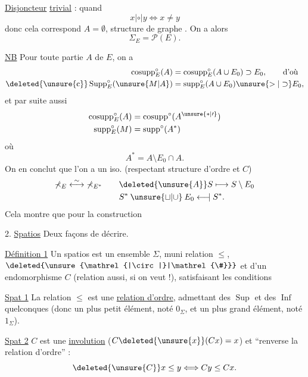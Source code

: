 \uline{Disjoncteur} \uline{trivial} : quand
\[
x\mathrel{|\circ|}y\Longleftrightarrow x\ne y
\]
donc cela correspond  $A=\emptyset$, structure de graphe . On a alors
\[
\mathbb{\Sigma}_{E}=\mathcal{P}(E).
\]

\uline{NB} Pour toute partie $A$ de $E$, on a
\[
\begin{aligned}
\operatorname{cosupp}_{E}^{\circ}(A)&=\operatorname{cosupp}_{E}^{\circ}(A\cup E_{0})\supset E_{0},\qquad\text{d'où}\\
\deleted{\unsure{\mathrm{c}}}\operatorname{Supp}_{E}^{\circ}(\unsure{M|A})&=\operatorname{supp}_{E}^{\circ}(A\cup E_{0})\unsure{>|\supset} E_{0},
\end{aligned}
\]
et par suite aussi
\[
\begin{aligned}
\operatorname{cosupp}_{E}^{\circ}(A)&=\operatorname{cosupp}^{\circ}(A^{\unsure{\ast|\prime}})\\
\operatorname{supp}_{E}^{\circ}(M)&=\operatorname{supp}^{\circ}(A^{\ast})
\end{aligned}
\]
où
\[
A^{\ast}=A\setminus E_{0}\cap A.
\]
On en conclut que l'on a un iso. (respectant structure d'ordre et $C$)
\[
\begin{aligned}
\mathbb{\Sigma}_{E}\mathrel{\overset{\sim}{\longleftrightarrow}}\mathbb{\Sigma}_{E^{\ast}}\qquad &\deleted{\unsure{A}}S\longmapsto S\setminus E_{0}\\
&S^{\ast}\mathbin{\unsure{\sqcup|\cup}}E_{0}\mathrel{\longleftarrow\mkern-9mu\vert} S^{\ast}.
\end{aligned}
\]
Cela montre que pour la construction

2. \uline{Spatios} Deux façons de  décrire.

\uline{Définition 1} Un spatios est un ensemble $\Sigma$, muni   relation $\leq$, $\deleted{\unsure{\mathrel{|\circ|}|\mathrel{\#}}}$ et d'un endomorphisme $C$ (relation aussi, si on veut !), satisfaisant les conditions

\uline{Spat 1} La relation $\leq$ est une \uline{relation d'ordre}, admettant des $\operatorname{Sup}$ et des $\operatorname{Inf}$ quelconques (donc un plus petit élément, noté  $0_{\Sigma}$, et un plus grand élément, noté  $1_{\Sigma}$).

\uline{Spat 2} $C$ est une \uline{involution} ($C\deleted{\unsure{x}}(Cx)=x$) et  ``renverse la relation d'ordre'' :
\[
\deleted{\unsure{C}}x\leq y\Longleftrightarrow Cy\leq Cx.
\]

